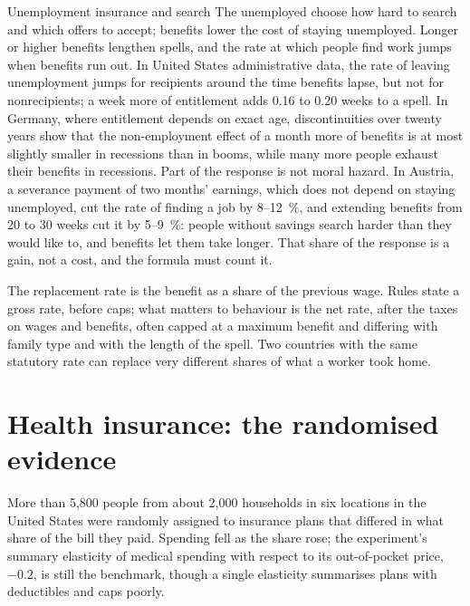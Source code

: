 \begin{model}{Unemployment insurance and search}
\assumes The unemployed choose how hard to search and which offers to accept;
benefits lower the cost of staying unemployed.
\predicts Longer or higher benefits lengthen spells, and the rate at which people
find work jumps when benefits run out.
\tested In United States administrative data, the rate of leaving unemployment
jumps for recipients around the time benefits lapse, but not for nonrecipients;
a week more of entitlement adds 0.16 to 0.20 weeks to a spell. %
In Germany, where entitlement depends on exact age, discontinuities over twenty
years show that the non-employment effect of a month more of benefits is at most
slightly smaller in recessions than in booms, while many more people exhaust their
benefits in recessions. %
\breaks Part of the response is not moral hazard. In Austria, a severance payment
of two months' earnings, which does not depend on staying unemployed, cut the rate
of finding a job by 8--12~\%, and extending benefits from 20 to 30 weeks cut it by
5--9~\%: people without savings search harder than they would like to, and benefits
let them take longer. %
That share of the response is a gain, not a cost, and the formula must count it.
\end{model}

\begin{measure}
The replacement rate is the benefit as a share of the previous wage. Rules state
a gross rate, before caps; what matters to behaviour is the
net rate, after the taxes on wages and benefits, often capped at a maximum benefit
and differing with family type and with the length of the spell. Two countries with
the same statutory rate can replace very different shares of what a worker took
home.
\end{measure}

\section{Health insurance: the randomised evidence}\label{sec:b3:social-insurance:health}

\begin{record}
More than 5{,}800 people from about 2{,}000 households in six locations in the United
States were randomly assigned to insurance plans that differed in what share of the
bill they paid. Spending fell as the share rose; the experiment's summary elasticity
of medical spending with respect to its out-of-pocket price, $-0.2$, is still the
benchmark, though a single elasticity summarises plans with deductibles and caps
poorly. %
\end{record}

